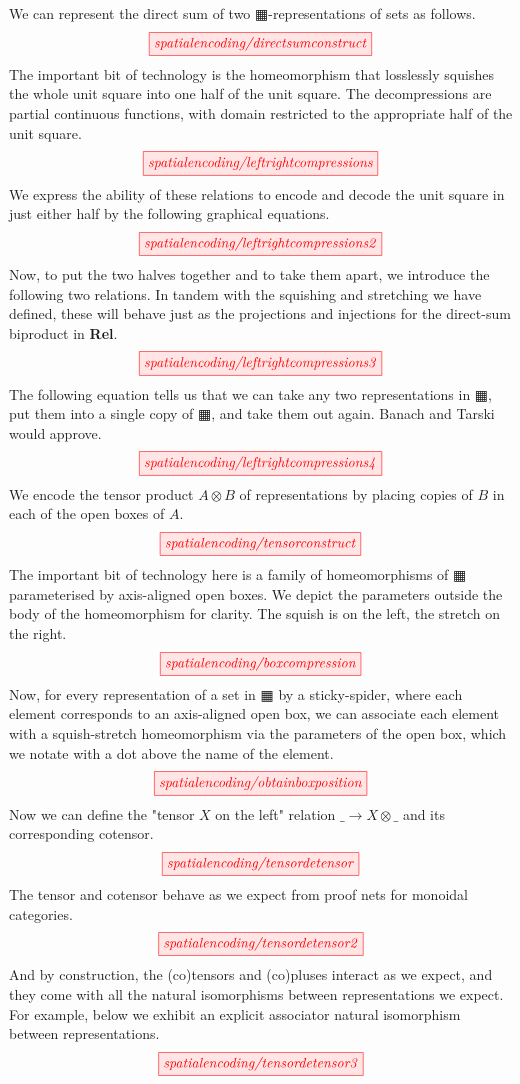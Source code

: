 \begin{fullwidth}
\begin{construction}
We can represent the direct sum of two $\squarehvfill$-representations of sets as follows.
\[\scalebox{1}{\tikzfig{spatialencoding/directsumconstruct}}\]
The important bit of technology is the homeomorphism that losslessly squishes the whole unit square into one half of the unit square. The decompressions are partial continuous functions, with domain restricted to the appropriate half of the unit square.
\[\scalebox{1}{\tikzfig{spatialencoding/leftrightcompressions}}\]
We express the ability of these relations to encode and decode the unit square in just either half by the following graphical equations.
\[\scalebox{1}{\tikzfig{spatialencoding/leftrightcompressions2}}\]
Now, to put the two halves together and to take them apart, we introduce the following two relations. In tandem with the squishing and stretching we have defined, these will behave just as the projections and injections for the direct-sum biproduct in \textbf{Rel}.
\[\scalebox{1}{\tikzfig{spatialencoding/leftrightcompressions3}}\]
The following equation tells us that we can take any two representations in $\squarehvfill$, put them into a single copy of $\squarehvfill$, and take them out again. Banach and Tarski would approve.
\[\scalebox{1}{\tikzfig{spatialencoding/leftrightcompressions4}}\]
We encode the tensor product $A \otimes B$ of representations by placing copies of $B$ in each of the open boxes of $A$.
\[\scalebox{1}{\tikzfig{spatialencoding/tensorconstruct}}\]
The important bit of technology here is a family of homeomorphisms of $\squarehvfill$ parameterised by axis-aligned open boxes. We depict the parameters outside the body of the homeomorphism for clarity. The squish is on the left, the stretch on the right.
\[\scalebox{1}{\tikzfig{spatialencoding/boxcompression}}\]
Now, for every representation of a set in $\squarehvfill$ by a sticky-spider, where each element corresponds to an axis-aligned open box, we can associate each element with a squish-stretch homeomorphism via the parameters of the open box, which we notate with a dot above the name of the element.
\[\scalebox{1}{\tikzfig{spatialencoding/obtainboxposition}}\]
Now we can define the "tensor $X$ on the left" relation $\_ \rightarrow X \otimes \_$ and its corresponding cotensor.
\[\scalebox{1}{\tikzfig{spatialencoding/tensordetensor}}\]
The tensor and cotensor behave as we expect from proof nets for monoidal categories.
\[\scalebox{1}{\tikzfig{spatialencoding/tensordetensor2}}\]
And by construction, the (co)tensors and (co)pluses interact as we expect, and they come with all the natural isomorphisms between representations we expect. For example, below we exhibit an explicit associator natural isomorphism between representations.
\[\scalebox{1}{\tikzfig{spatialencoding/tensordetensor3}}\]
\end{construction}


\end{fullwidth}
